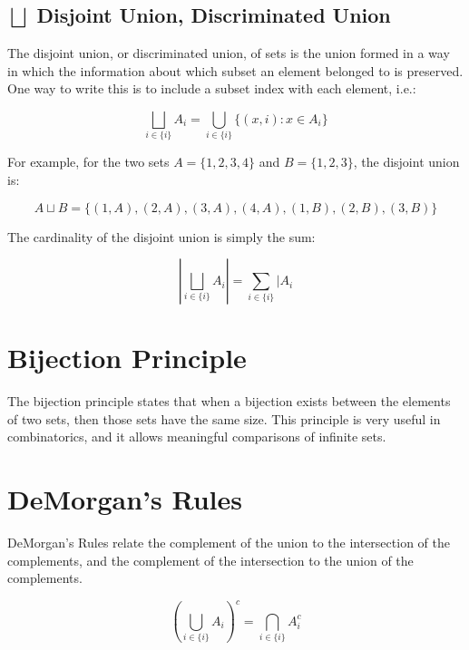 \subsection{$\bigsqcup$ Disjoint Union, Discriminated Union}
The disjoint union, or discriminated union, of sets is the union formed in a way in which the information about which subset an element belonged to is preserved. One way to write this is to include a subset index with each element, i.e.:

\begin{equation}
\bigsqcup_{i\in\{i\}}A_i = \bigcup_{i\in\{i\}} \{(x,i): x\in A_i\}
\end{equation}

For example, for the two sets $A=\{1,2,3,4\}$ and $B=\{1,2,3\}$, the disjoint union is:

\begin{equation}
A\sqcup B = \{(1,A),(2,A),(3,A),(4,A),(1,B),(2,B),(3,B)\}
\end{equation}

The cardinality of the disjoint union is simply the sum:

\begin{equation}
\left|\bigsqcup_{i\in\{i\}}A_i\right| = \sum_{i\in\{i\}}|A_i
\end{equation}



\section{Bijection Principle}
The bijection principle states that when a bijection exists between the elements of two sets, then those sets have the same size. This principle is very useful in combinatorics, and it allows meaningful comparisons of infinite sets.


\section{DeMorgan's Rules}
\label{sec:demorgan}
DeMorgan's Rules relate the complement of the union to the intersection of the complements, and the complement of the intersection to the union of the complements.

\label{sec:demorgan}

\begin{equation}
\left(\bigcup_{i\in\{i\}}A_i\right)^c = \bigcap_{i\in\{i\}}A^c_i
\end{equation}

